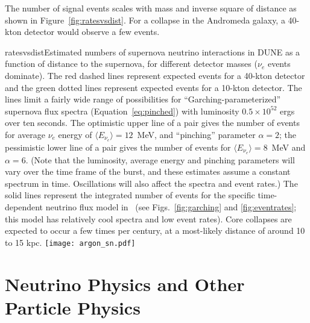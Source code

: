 The number of signal events scales with mass and inverse square of distance as shown in Figure~\ref{fig:ratesvsdist}.  For a collapse in the Andromeda galaxy, a 40-kton detector would observe a few events.

\begin{cdrfigure}{ratesvsdist}{Estimated numbers of supernova neutrino interactions in DUNE as a function of distance to the supernova, for different detector masses ($\nu_e$ events dominate). The red dashed lines  represent expected events for a 40-kton detector and the green dotted lines represent expected events for a 10-kton detector. The lines limit a fairly wide range of possibilities for ``Garching-parameterized'' supernova flux spectra (Equation~\ref{eq:pinched}) with luminosity $0.5\times 10^{52}$ ergs over ten seconds. The optimistic upper line of a pair gives the number of events for average $\nu_e$ energy of $\langle E_{\nu_e}\rangle =12$~MeV, and ``pinching'' parameter $\alpha=2$; the pessimistic lower line of a pair gives the number of events for $\langle E_{\nu_e}\rangle=8$~MeV and $\alpha=6$. (Note that the luminosity, average energy and pinching parameters will vary over the time frame of the burst, and these estimates assume a constant spectrum in time. Oscillations will also affect the spectra and event rates.) The solid lines represent the integrated number of events for the specific time-dependent neutrino flux model in~\cite{Huedepohl:2009wh} (see Figs.~\ref{fig:garching} and \ref{fig:eventrates}; this model has relatively cool spectra and low event rates). Core collapses are expected to occur a few times per century, at a most-likely distance of around 10 to 15 kpc.}
\texttt{[image: argon\_sn.pdf]}
\end{cdrfigure}



\section{Neutrino Physics and Other Particle Physics}
\label{sec:physics-snblowe-neutrino-physics}


